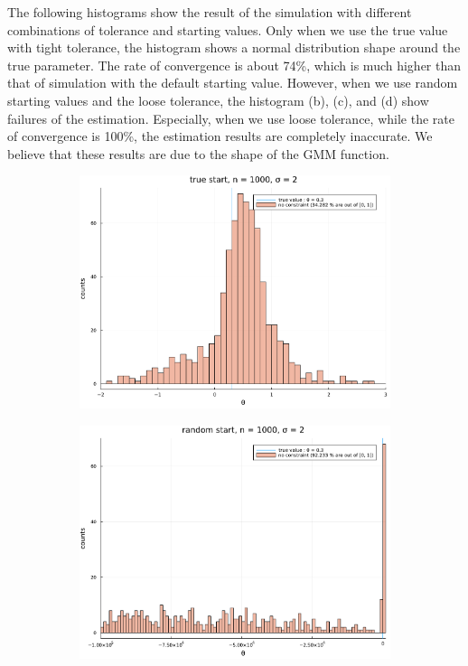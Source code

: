 \documentclass[11pt, a4paper]{article}
\begin{document}
The following histograms show the result of the simulation with different combinations of tolerance and starting values.
Only when we use the true value with tight tolerance, the histogram shows a 
normal distribution shape around the true parameter.
The rate of convergence is about 74\%, which is much higher than that of simulation with the default starting value.
However, when we use random starting values and the loose tolerance, the histogram (b), (c), and (d) show failures of the estimation.
Especially, when we use loose tolerance, while the rate of convergence is 100\%, the estimation results are completely inaccurate.
We believe that these results are due to the shape of the GMM function.


\begin{figure}
    \centering
     \begin{subfigure}[b]{0.475\textwidth}
         \centering
         \includegraphics[width=\textwidth]{check_numerical_error/tight/histogram_loglinear_loglinear_n_1000_sigma_2_non_constraint_true_start.pdf}
         \caption{}
     \end{subfigure}
     \hfill
     \begin{subfigure}[b]{0.475\textwidth}
         \centering
         \includegraphics[width=\textwidth]{check_numerical_error/tight/histogram_loglinear_loglinear_n_1000_sigma_2_non_constraint_random_start.pdf}

\end{subfigure}
\end{figure}
\end{document}
